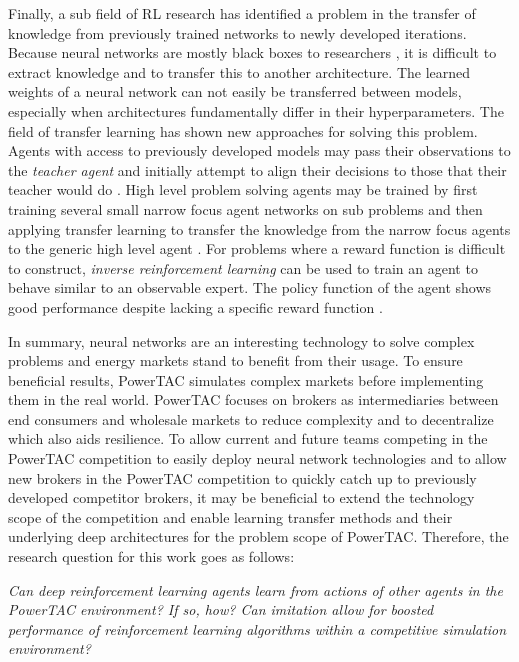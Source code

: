 Finally, a sub field of \ac{RL} research has identified a problem in the transfer of knowledge from previously trained
networks to newly developed iterations. Because neural networks are mostly black boxes to researchers
\cite[]{yosinski2015understanding}, it is difficult to extract knowledge and to transfer this to another architecture. The
learned weights of a neural network can not easily be transferred between models, especially when architectures fundamentally
differ in their hyperparameters. The field of transfer learning has shown new approaches for solving this problem.
Agents with access to previously developed models may pass their observations to the \emph{teacher agent} and initially
attempt to align their decisions to those that their teacher would do \cite[]{schmitt2018kickstarting}. High level
problem solving agents may be trained by first training several small narrow focus agent networks on sub problems and
then applying transfer learning to transfer the knowledge from the narrow focus agents to the generic high level
agent \cite[]{parisotto2015actor}. For problems where a reward function is difficult to construct, \emph{inverse
reinforcement learning} can be used to train an agent to behave similar to an observable expert. The policy function of
the agent shows good performance despite lacking a specific reward function \cite[]{NG2004Apprentice}.

In summary, neural networks are an interesting technology to solve complex problems and energy markets stand to benefit from
their usage. To ensure beneficial results, \ac{PowerTAC} simulates complex markets before implementing them in the real
world. \ac{PowerTAC} focuses on brokers as intermediaries between end consumers and wholesale markets to reduce
complexity and to decentralize which also aids resilience. To allow current and future teams competing in the \ac{PowerTAC}
competition to easily deploy neural network technologies and to allow new brokers in the \ac{PowerTAC} competition to quickly
catch up to previously developed competitor brokers, it may be beneficial to extend the technology scope of the
competition and enable learning transfer methods and their underlying deep architectures for the problem scope of
\ac{PowerTAC}. Therefore, the research question for this work goes as follows:

\emph{Can deep reinforcement learning agents learn from actions of other agents in the \ac{PowerTAC} environment? If so,
    how? Can imitation allow for boosted performance of reinforcement learning algorithms within a competitive simulation
environment?}



